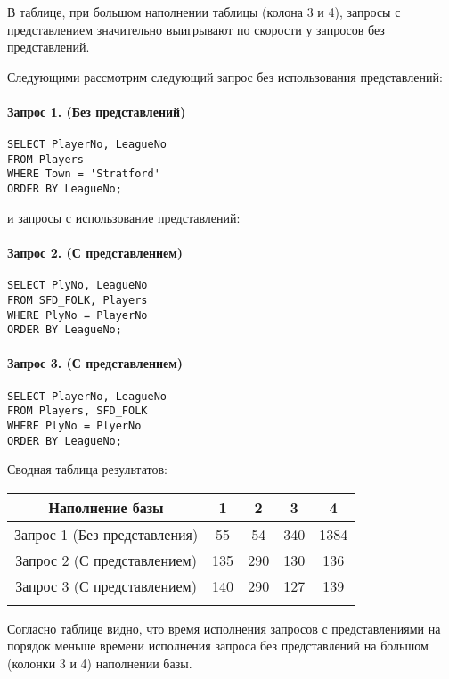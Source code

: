 \documentclass[a4paper,12pt]{article}
\begin{document}
В таблице, при большом наполнении таблицы (колона 3 и 4), запросы с представлением значительно выигрывают по скорости у запросов без представлений.

Следующими рассмотрим следующий запрос без использования представлений:

\paragraph{Запрос 1. (Без представлений)}
\begin{lstlisting}
SELECT PlayerNo, LeagueNo
FROM Players
WHERE Town = 'Stratford'
ORDER BY LeagueNo;
\end{lstlisting}

и запросы с использование представлений:

\paragraph{Запрос 2. (С представлением)}
\begin{lstlisting}
SELECT PlyNo, LeagueNo
FROM SFD_FOLK, Players
WHERE PlyNo = PlayerNo
ORDER BY LeagueNo;
\end{lstlisting}

\paragraph{Запрос 3. (С представлением)}
\begin{lstlisting}
SELECT PlayerNo, LeagueNo
FROM Players, SFD_FOLK
WHERE PlyNo = PlyerNo
ORDER BY LeagueNo;
\end{lstlisting}

Сводная таблица результатов:

\begin{tabular}[t]{|c|c|c|c|c|}
\hline
Наполнение базы  &    1 &    2 &    3 &    4 \\
\hline
Запрос 1 (Без представления)         &   55 &   54 &  340 & 1384 \\
\hline
Запрос 2 (С представлением)         &  135 &  290 &  130 &  136 \\
\hline
Запрос 3 (С представлением)         &  140 &  290 &  127 &  139 \\
\hline
\caption{Сводная таблица 2.}
\end{tabular}

Согласно таблице видно, что время исполнения запросов с представлениями на порядок меньше времени исполнения запроса без представлений на большом (колонки 3 и 4) наполнении базы. 
\end{document}
